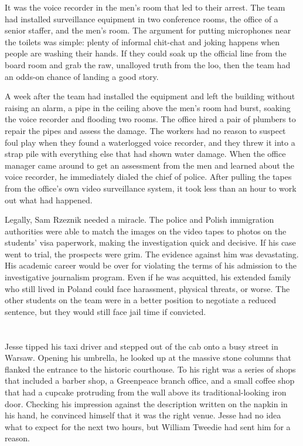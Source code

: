 \documentclass[12pt]{book}
\begin{document}
It was the voice recorder in the men's room that led to their arrest.  The team had installed surveillance equipment in two conference rooms, the office of a senior staffer, and the men's room.  The argument for putting microphones near the toilets was simple: plenty of informal chit-chat and joking happens when people are washing their hands.  If they could soak up the official line from the board room and grab the raw, unalloyed truth from the loo, then the team had an odds-on chance of landing a good story.

A week after the team had installed the equipment and left the building without raising an alarm, a pipe in the ceiling above the men's room had burst, soaking the voice recorder and flooding two rooms.  The office hired a pair of plumbers to repair the pipes and assess the damage.  The workers had no reason to suspect foul play when they found a waterlogged voice recorder, and they threw it into a strap pile with everything else that had shown water damage.  When the office manager came around to get an assessment from the men and learned about the voice recorder, he immediately dialed the chief of police.  After pulling the tapes from the office's own video surveillance system, it took less than an hour to work out what had happened.

Legally, Sam Rzeznik needed a miracle.  The police and Polish immigration authorities were able to match the images on the video tapes to photos on the students' visa paperwork, making the investigation quick and decisive.  If his case went to trial, the prospects were grim.  The evidence against him was devastating.  His academic career would be over for violating the terms of his admission to the investigative journalism program.  Even if he was acquitted, his extended family who still lived in Poland could face harassment, physical threats, or worse.  The other students on the team were in a better position to negotiate a reduced sentence, but they would still face jail time if convicted.

\chapter{}
									
Jesse tipped his taxi driver and stepped out of the cab onto a busy street in Warsaw.  Opening his umbrella, he looked up at the massive stone columns that flanked the entrance to the historic courthouse.  To his right was a series of shops that included a barber shop, a Greenpeace branch office, and a small coffee shop that had a cupcake protruding from the wall above its traditional-looking iron door.  Checking his impression against the description written on the napkin in his hand, he convinced himself that it was the right venue.  Jesse had no idea what to expect for the next two hours, but William Tweedie had sent him for a reason.
\end{document}
